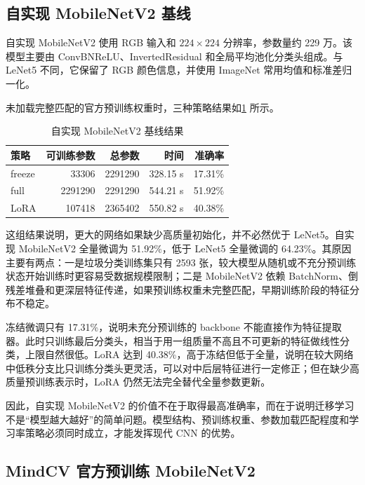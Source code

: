 \subsection{自实现 MobileNetV2 基线}

自实现 MobileNetV2 使用 RGB 输入和 $224\times224$ 分辨率，参数量约 229 万。该模型主要由 ConvBNReLU、InvertedResidual 和全局平均池化分类头组成。与 LeNet5 不同，它保留了 RGB 颜色信息，并使用 ImageNet 常用均值和标准差归一化。

未加载完整匹配的官方预训练权重时，三种策略结果如\cref{tab:mobile_self} 所示。

\begin{table}[!htb]
  \centering
  \caption{自实现 MobileNetV2 基线结果}
  \label{tab:mobile_self}
  \small
  \begin{tabular}{@{}lrrrr@{}}
    \toprule
    \textbf{策略} & \textbf{可训练参数} & \textbf{总参数} & \textbf{时间} & \textbf{准确率} \\
    \midrule
    freeze & 33306 & 2291290 & 328.15 s & 17.31\% \\
    full & 2291290 & 2291290 & 544.21 s & 51.92\% \\
    LoRA & 107418 & 2365402 & 550.82 s & 40.38\% \\
    \bottomrule
  \end{tabular}
\end{table}

这组结果说明，更大的网络如果缺少高质量初始化，并不必然优于 LeNet5。自实现 MobileNetV2 全量微调为 51.92\%，低于 LeNet5 全量微调的 64.23\%。其原因主要有两点：一是垃圾分类训练集只有 2593 张，较大模型从随机或不充分预训练状态开始训练时更容易受数据规模限制；二是 MobileNetV2 依赖 BatchNorm、倒残差堆叠和更深层特征传递，如果预训练权重未完整匹配，早期训练阶段的特征分布不稳定。

冻结微调只有 17.31\%，说明未充分预训练的 backbone 不能直接作为特征提取器。此时只训练最后分类头，相当于用一组质量不高且不可更新的特征做线性分类，上限自然很低。LoRA 达到 40.38\%，高于冻结但低于全量，说明在较大网络中低秩分支比只训练分类头更灵活，可以对中后层特征进行一定修正；但在缺少高质量预训练表示时，LoRA 仍然无法完全替代全量参数更新。

因此，自实现 MobileNetV2 的价值不在于取得最高准确率，而在于说明迁移学习不是“模型越大越好”的简单问题。模型结构、预训练权重、参数加载匹配程度和学习率策略必须同时成立，才能发挥现代 CNN 的优势。

\subsection{MindCV 官方预训练 MobileNetV2}

